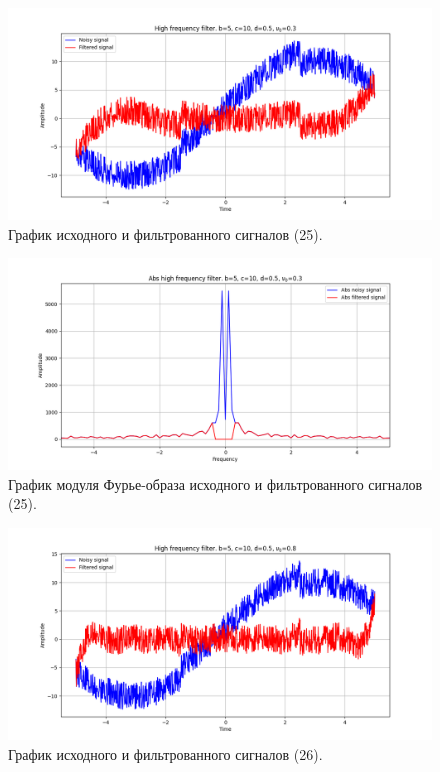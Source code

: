 \documentclass[a4paper, 12pt]{article}
\begin{document}
    \begin{figure}[!htb]
        \centering
        \includegraphics[scale=0.48]{25_u_flt_u_nolow.png}
        \captionsetup{skip=0pt}
        \caption{График исходного и фильтрованного сигналов (25).}
        \label{fig:fig_g}
    \end{figure}
    \begin{figure}[!htb]
        \centering
        \includegraphics[scale=0.48]{25_abs_u_U_nolow.png}
        \captionsetup{skip=0pt}
        \caption{График модуля Фурье-образа исходного и фильтрованного сигналов (25).}
        \label{fig:fig_h}
    \end{figure}
    \begin{figure}[!htb]
        \centering
        \includegraphics[scale=0.48]{26_u_flt_u_nolow.png}
        \captionsetup{skip=0pt}
        \caption{График исходного и фильтрованного сигналов (26).}
        \label{fig:fig_323234}
    \end{figure}
\end{document}
